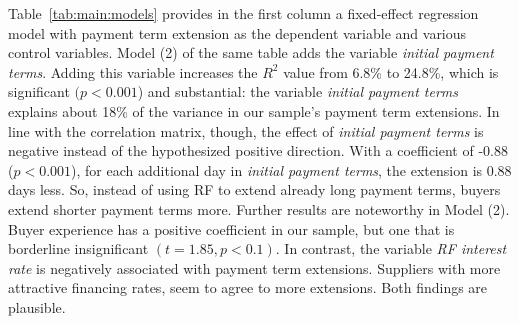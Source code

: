 \documentclass[A4,11pt]{article}
\renewcommand{\~}[1]{\tilde{#1}}
\renewcommand{\-}[1]{\overline{#1}}
\newcommand{\pDefSigCor}[0]{${}^{*} p <0.05$}
\begin{document}
\begin{table}[t]$\,$\vspace{4pt}\\
\caption{Correlation Matrix. $N = 1,276$, \pDefSigCor.\vspace{12pt}}
\label{tab:corr}
{
}
\end{table}%


Table~\ref{tab:main:models} provides in the first column a fixed-effect regression model with payment term extension as the dependent variable and various control variables. Model (2) of the same table adds the variable \textit{initial payment terms}. Adding this variable increases the $R^2$ value from 6.8\% to 24.8\%, which is significant $(p<0.001$) and substantial: the variable \textit{initial payment terms} explains about 18\% of the variance in our sample's payment term extensions. In line with the correlation matrix, though, the effect of \textit{initial payment terms} is negative instead of the hypothesized positive direction. With a coefficient of -0.88 ($p<0.001$), for each additional day in \textit{initial payment terms}, the extension is 0.88 days less. So, instead of using RF to extend already long payment terms, buyers extend shorter payment terms more. Further results are noteworthy in Model (2). Buyer experience has a positive coefficient in our sample, but one that is borderline insignificant $(t=1.85, p<0.1)$. In contrast, the variable \textit{RF interest rate} is negatively associated with payment term extensions. Suppliers with more attractive financing rates, seem to agree to more extensions. Both findings are plausible.
\end{document}
